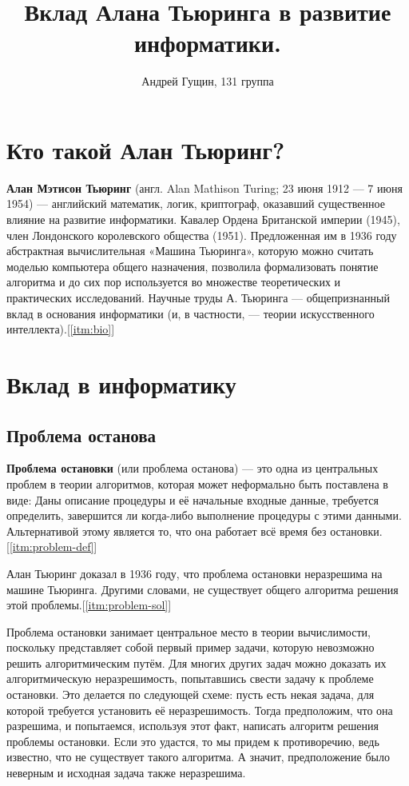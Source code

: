 \documentclass{article}
\author{Андрей Гущин, 131 группа}
\title{Вклад Алана Тьюринга в развитие информатики.}
\begin{document}
\maketitle

\section{Кто такой Алан Тьюринг?}
\textbf{Алан Мэтисон Тьюринг} (англ. Alan Mathison Turing; 23 июня 1912 — 7 июня 1954) 
— английский математик, логик, криптограф, оказавший существенное влияние на развитие 
информатики. Кавалер Ордена Британской империи (1945), член Лондонского королевского 
общества (1951). Предложенная им в 1936 году абстрактная вычислительная 
«Машина Тьюринга», которую можно считать моделью компьютера общего назначения, 
позволила формализовать понятие алгоритма и до сих пор используется во множестве 
теоретических и практических исследований. Научные труды А. Тьюринга — общепризнанный
вклад в основания информатики (и, в частности, — теории искусственного интеллекта).[\ref{itm:bio}]

\section{Вклад в информатику}
\subsection{Проблема останова}
\textbf{Проблема остановки} (или проблема останова) — это одна из центральных проблем в 
теории алгоритмов, которая может неформально быть поставлена в виде:
Даны описание процедуры и её начальные входные данные, требуется определить, 
завершится ли когда-либо выполнение процедуры с этими данными. 
Альтернативой этому является то, что она работает всё время без остановки.[\ref{itm:problem-def}]

Алан Тьюринг доказал в 1936 году, что проблема остановки неразрешима на машине Тьюринга. 
Другими словами, не существует общего алгоритма решения этой проблемы.[\ref{itm:problem-sol}]

Проблема остановки занимает центральное место в теории вычислимости, поскольку 
представляет собой первый пример задачи, которую невозможно решить алгоритмическим 
путём. Для многих других задач можно доказать их алгоритмическую неразрешимость, 
попытавшись свести задачу к проблеме остановки. Это делается по следующей схеме: 
пусть есть некая задача, для которой требуется установить её неразрешимость. 
Тогда предположим, что она разрешима, и попытаемся, используя этот факт, написать 
алгоритм решения проблемы остановки. Если это удастся, то мы придем к противоречию, 
ведь известно, что не существует такого алгоритма. А значит, предположение было 
неверным и исходная задача также неразрешима. 
\end{document}
